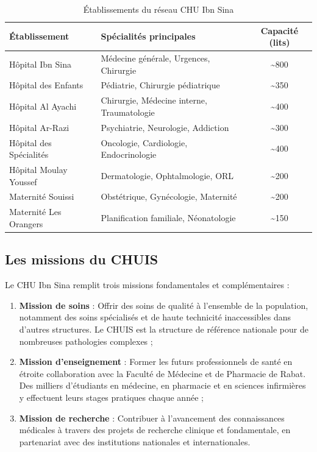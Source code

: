 \documentclass[12pt,a4paper]{report}
\begin{document}
	\begin{table}[H]
		\centering
		\caption{Établissements du réseau CHU Ibn Sina}
		\renewcommand{\arraystretch}{1.3}
		\begin{tabularx}{\textwidth}{lXc}
			\toprule
			\textbf{Établissement} & \textbf{Spécialités principales} & \textbf{Capacité (lits)} \\
			\midrule
			Hôpital Ibn Sina          & Médecine générale, Urgences, Chirurgie   & \textasciitilde 800 \\
			Hôpital des Enfants       & Pédiatrie, Chirurgie pédiatrique          & \textasciitilde 350 \\
			Hôpital Al Ayachi         & Chirurgie, Médecine interne, Traumatologie & \textasciitilde 400 \\
			Hôpital Ar-Razi           & Psychiatrie, Neurologie, Addiction        & \textasciitilde 300 \\
			Hôpital des Spécialités   & Oncologie, Cardiologie, Endocrinologie    & \textasciitilde 400 \\
			Hôpital Moulay Youssef    & Dermatologie, Ophtalmologie, ORL          & \textasciitilde 200 \\
			Maternité Souissi         & Obstétrique, Gynécologie, Maternité       & \textasciitilde 200 \\
			Maternité Les Orangers    & Planification familiale, Néonatologie     & \textasciitilde 150 \\
			\bottomrule
		\end{tabularx}
	\end{table}
	
	\subsection{Les missions du CHUIS}
	
	Le CHU Ibn Sina remplit trois missions fondamentales et complémentaires :
	
	\begin{enumerate}[leftmargin=1.5cm]
		\item \textbf{Mission de soins} : Offrir des soins de qualité à l'ensemble de la population,
		notamment des soins spécialisés et de haute technicité inaccessibles dans d'autres
		structures. Le CHUIS est la structure de référence nationale pour de nombreuses
		pathologies complexes ;
		\item \textbf{Mission d'enseignement} : Former les futurs professionnels de santé en
		étroite collaboration avec la Faculté de Médecine et de Pharmacie de Rabat. Des
		milliers d'étudiants en médecine, en pharmacie et en sciences infirmières y effectuent
		leurs stages pratiques chaque année ;
		\item \textbf{Mission de recherche} : Contribuer à l'avancement des connaissances médicales
		à travers des projets de recherche clinique et fondamentale, en partenariat avec des
		institutions nationales et internationales.
	\end{enumerate}
	
\end{document}
